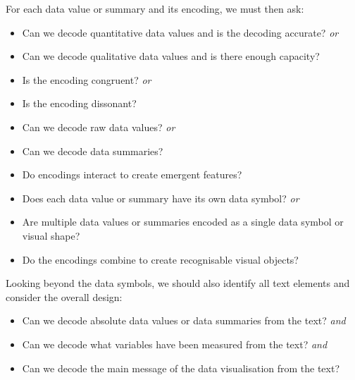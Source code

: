 \documentclass[
  letterpaper,
  DIV=11,
  numbers=noendperiod]{scrreprt}
\providecommand{\tightlist}{%
  \setlength{\itemsep}{0pt}\setlength{\parskip}{0pt}}
\begin{document}
For each data value or summary and its encoding, we must then ask:

\begin{itemize}
\tightlist
\item
  Can we decode quantitative data values and is the decoding accurate?
  \emph{or}
\item
  Can we decode qualitative data values and is there enough capacity?
\end{itemize}

\begin{itemize}
\tightlist
\item
  Is the encoding congruent? \emph{or}
\item
  Is the encoding dissonant?
\end{itemize}

\begin{itemize}
\tightlist
\item
  Can we decode raw data values? \emph{or}
\item
  Can we decode data summaries?
\end{itemize}

\begin{itemize}
\tightlist
\item
  Do encodings interact to create emergent features?
\end{itemize}

\begin{itemize}
\tightlist
\item
  Does each data value or summary have its own data symbol? \emph{or}
\item
  Are multiple data values or summaries encoded as a single data symbol
  or visual shape?
\end{itemize}

\begin{itemize}
\tightlist
\item
  Do the encodings combine to create recognisable visual objects?
\end{itemize}

Looking beyond the data symbols, we should also identify all text
elements and consider the overall design:

\begin{itemize}
\tightlist
\item
  Can we decode absolute data values or data summaries from the text?
  \emph{and}
\item
  Can we decode what variables have been measured from the text?
  \emph{and}
\item
  Can we decode the main message of the data visualisation from the
  text?
\end{itemize}
\end{document}
